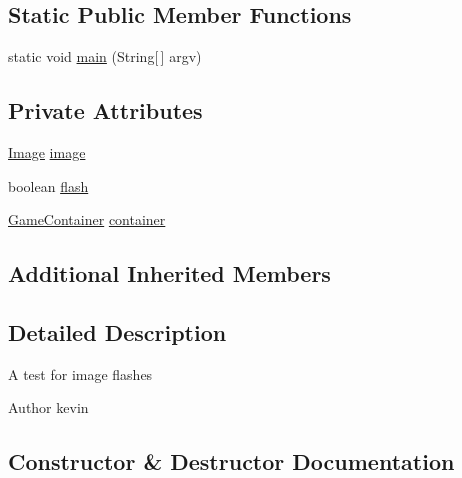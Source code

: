 \subsection*{Static Public Member Functions}
\begin{DoxyCompactItemize}
\item 
static void \mbox{\hyperlink{classorg_1_1newdawn_1_1slick_1_1tests_1_1_flash_test_a4e0a5cdc10420a47c2d3faee14a2fa1f}{main}} (String\mbox{[}$\,$\mbox{]} argv)
\end{DoxyCompactItemize}
\subsection*{Private Attributes}
\begin{DoxyCompactItemize}
\item 
\mbox{\hyperlink{classorg_1_1newdawn_1_1slick_1_1_image}{Image}} \mbox{\hyperlink{classorg_1_1newdawn_1_1slick_1_1tests_1_1_flash_test_af72465c4320b1f9ceb938886132ccf84}{image}}
\item 
boolean \mbox{\hyperlink{classorg_1_1newdawn_1_1slick_1_1tests_1_1_flash_test_a190c127d700a8eb39c86d39f26b83d7f}{flash}}
\item 
\mbox{\hyperlink{classorg_1_1newdawn_1_1slick_1_1_game_container}{Game\+Container}} \mbox{\hyperlink{classorg_1_1newdawn_1_1slick_1_1tests_1_1_flash_test_ad78e2796710293c14d8913b36a8e9e01}{container}}
\end{DoxyCompactItemize}
\subsection*{Additional Inherited Members}


\subsection{Detailed Description}
A test for image flashes

\begin{DoxyAuthor}{Author}
kevin 
\end{DoxyAuthor}


\subsection{Constructor \& Destructor Documentation}
\mbox{\label{classorg_1_1newdawn_1_1slick_1_1tests_1_1_flash_test_a87a0e80ab43bf543fad77233ee937c24}} 
